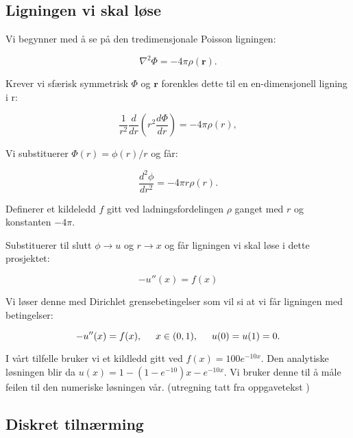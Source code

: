 \documentclass[reprint,english,notitlepage]{revtex4-1}
\begin{document}
\subsection{Ligningen vi skal løse}

	Vi begynner med å se på den tredimensjonale Poisson ligningen:
	
	\begin{equation*}
	\nabla^2 \Phi = -4\pi \rho (\mathbf{r}).
	\end{equation*}
	
	Krever vi sfærisk symmetrisk $\Phi$ og $\mathbf{r}$ forenkles dette til en en-dimensjonell ligning i r:
	
	\begin{equation*}
	\frac{1}{r^2}\frac{d}{dr}\left(r^2\frac{d\Phi}{dr}\right) = -4\pi \rho(r),
	\end{equation*}
	
	Vi substituerer $\Phi(r)= \phi(r)/r$ og får:
	
	\begin{equation*}
	\frac{d^2\phi}{dr^2}= -4\pi r\rho(r).
	\end{equation*}
	
	Definerer et kildeledd $f$ gitt ved ladningsfordelingen $\rho$ ganget med $r$ og konstanten $-4\pi$.
	
	Substituerer til slutt $\phi\rightarrow u$ og $r\rightarrow x$ og får ligningen vi skal løse i dette prosjektet:
	
	\begin{equation*}
	-u''(x) = f(x)
	\end{equation*}
	
	Vi løser denne med Dirichlet grensebetingelser som vil si at vi får ligningen med betingelser:
	
	\begin{equation*}
	-u''(x) = f(x), \hspace{0.5cm} x\in(0,1), \hspace{0.5cm} u(0) = u(1) = 0.
	\end{equation*}
	
	I vårt tilfelle bruker vi et kildledd gitt ved $f(x) = 100e^{-10x}$. Den analytiske løsningen blir da $u(x) = 1 - (1 - e^{-10})x - e^{-10x}$. Vi bruker denne til å måle feilen til den numeriske løsningen vår. (utregning tatt fra oppgavetekst \cite{oppgavetekst})

\subsection{Diskret tilnærming}
\end{document}
